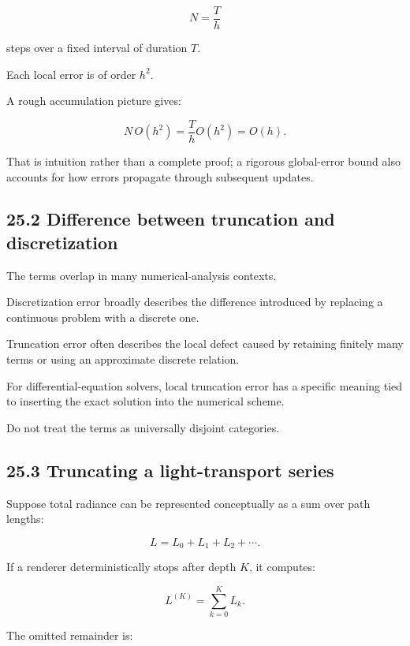 \[ N=\frac Th \]

steps over a fixed interval of duration \(T\).

Each local error is of order \(h^2\).

A rough accumulation picture gives:

\[ N\,O(h^2) = \frac Th O(h^2) = O(h). \]

That is intuition rather than a complete proof; a rigorous global-error bound also accounts for how errors propagate through subsequent updates.

\subsection{25.2 Difference between truncation and discretization}\label{02-foundations-ii-ch029-difference-between-truncation-and-discretization}

\hypertarget{02-foundations-ii-ch029-difference-between-truncation-and-discretization}{}

The terms overlap in many numerical-analysis contexts.

Discretization error broadly describes the difference introduced by replacing a continuous problem with a discrete one.

Truncation error often describes the local defect caused by retaining finitely many terms or using an approximate discrete relation.

For differential-equation solvers, local truncation error has a specific meaning tied to inserting the exact solution into the numerical scheme.

Do not treat the terms as universally disjoint categories.

\subsection{25.3 Truncating a light-transport series}\label{02-foundations-ii-ch029-truncating-a-light-transport-series}

\hypertarget{02-foundations-ii-ch029-truncating-a-light-transport-series}{}

Suppose total radiance can be represented conceptually as a sum over path lengths:

\[ L=L_0+L_1+L_2+\cdots. \]

If a renderer deterministically stops after depth \(K\), it computes:

\[ L^{(K)}=\sum_{k=0}^{K}L_k. \]

The omitted remainder is:

